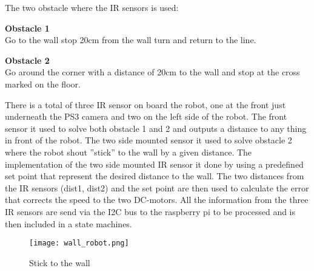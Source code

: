 The two obstacle where the IR sensors is used:
\begin{itemize}
	\begin{item}
		\textbf{ Obstacle 1}\\ Go to the wall stop 20cm from the wall turn and return to the line.
	\end{item}
	
	\begin{item}
		\textbf{ Obstacle 2}\\Go around the corner with a distance of 20cm to the wall and stop at the cross marked on the floor. 
	\end{item}
\end{itemize}

There is a total of three IR sensor on board the robot, one at the front just underneath the PS3 camera and two on the left side of the robot. The front sensor it used to solve both obstacle 1 and 2 and outputs a distance to any thing in front of the robot. The two side mounted sensor it used to solve obstacle 2 where the robot shout ''stick'' to the wall by a given distance. 
The implementation of the two side mounted IR sensor it done by using a predefined set point that represent the desired distance to the wall. The two distances from the IR sensors (dist1, dist2) and the set point are then used to calculate the error that corrects the speed to the two DC-motors. All the information from the three IR sensors are send via the I2C bus to the raspberry pi to be processed and is then included in a state machines.
  \begin{figure}[!h!]
	\centering
	\texttt{[image: wall\_robot.png]}
	\caption{Stick to the wall}
	\label{fig:3}
\end{figure}



      





